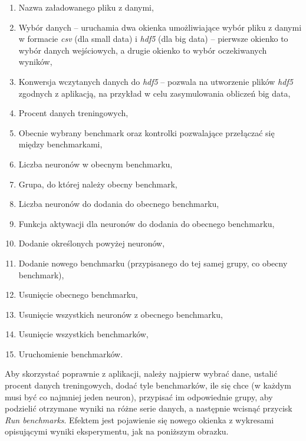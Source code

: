 \documentclass{article}
\begin{document}
\begin{enumerate}
\item Nazwa załadowanego pliku z danymi,
\item Wybór danych -- uruchamia dwa okienka umożliwiające wybór pliku z danymi w formacie \textit{csv} (dla small data) i \textit{hdf5} (dla big data) -- pierwsze okienko to wybór danych wejściowych, a drugie okienko to wybór oczekiwanych wyników,
\item Konwersja wczytanych danych do \textit{hdf5} -- pozwala na utworzenie plików \textit{hdf5} zgodnych z aplikacją, na przykład w celu zasymulowania obliczeń big data,
\item Procent danych treningowych,
\item Obecnie wybrany benchmark oraz kontrolki pozwalające przełączać się między benchmarkami,
\item Liczba neuronów w obecnym benchmarku,
\item Grupa, do której należy obecny benchmark,
\item Liczba neuronów do dodania do obecnego benchmarku,
\item Funkcja aktywacji dla neuronów do dodania do obecnego benchmarku,
\item Dodanie określonych powyżej neuronów,
\item Dodanie nowego benchmarku (przypisanego do tej samej grupy, co obecny benchmark),
\item Usunięcie obecnego benchmarku,
\item Usunięcie wszystkich neuronów z obecnego benchmarku,
\item Usunięcie wszystkich benchmarków,
\item Uruchomienie benchmarków.
\end{enumerate}
Aby skorzystać poprawnie z aplikacji, należy najpierw wybrać dane, ustalić procent danych treningowych, dodać tyle benchmarków, ile się chce (w każdym musi być co najmniej jeden neuron), przypisać im odpowiednie grupy, aby podzielić otrzymane wyniki na różne serie danych, a następnie wcisnąć przycisk \textit{Run benchmarks}. Efektem jest pojawienie się nowego okienka z wykresami opisującymi wyniki eksperymentu, jak na poniższym obrazku.
\end{document}
